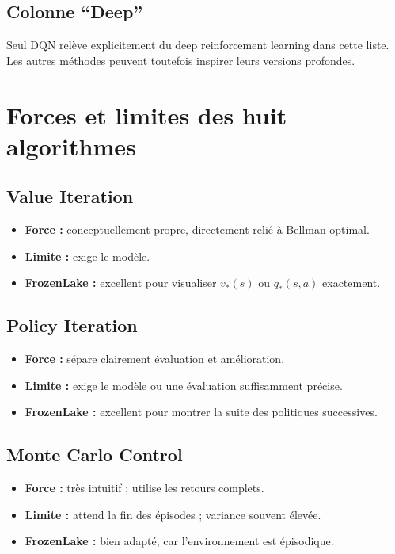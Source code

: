 \documentclass[11pt,a4paper]{article}
\begin{document}
\subsection{Colonne ``Deep''}

Seul DQN relève explicitement du deep reinforcement learning dans cette liste. Les autres méthodes peuvent toutefois inspirer leurs versions profondes.

\section{Forces et limites des huit algorithmes}

\subsection{Value Iteration}

\begin{itemize}[leftmargin=1.6em]
    \item \textbf{Force :} conceptuellement propre, directement relié à Bellman optimal.
    \item \textbf{Limite :} exige le modèle.
    \item \textbf{FrozenLake :} excellent pour visualiser $v_*(s)$ ou $q_*(s,a)$ exactement.
\end{itemize}

\subsection{Policy Iteration}

\begin{itemize}[leftmargin=1.6em]
    \item \textbf{Force :} sépare clairement évaluation et amélioration.
    \item \textbf{Limite :} exige le modèle ou une évaluation suffisamment précise.
    \item \textbf{FrozenLake :} excellent pour montrer la suite des politiques successives.
\end{itemize}

\subsection{Monte Carlo Control}

\begin{itemize}[leftmargin=1.6em]
    \item \textbf{Force :} très intuitif ; utilise les retours complets.
    \item \textbf{Limite :} attend la fin des épisodes ; variance souvent élevée.
    \item \textbf{FrozenLake :} bien adapté, car l'environnement est épisodique.
\end{itemize}
\end{document}
